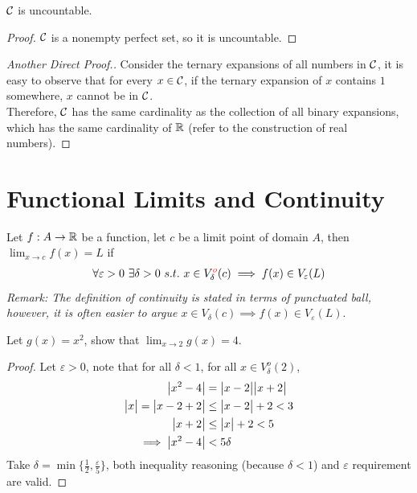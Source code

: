 \documentclass[11pt]{article}
\begin{document}
	\begin{proposition}
		$\mathcal{{C}}$ is uncountable.
	\end{proposition}
	
	\begin{proof}
		$\mathcal{{C}}$ is a nonempty perfect set, so it is uncountable.
	\end{proof}
	
	\begin{proof}[Another Direct Proof.]
		Consider the ternary expansions of all numbers in $\mathcal{{C}}$, it is easy to observe that for every $x \in \mathcal{{C}}$, if the ternary expansion of $x$ contains $1$ somewhere, $x$ cannot be in $\mathcal{{C}}$. \\
		Therefore, $\mathcal{{C}}$ has the same cardinality as the collection of all binary expansions, which has the same cardinality of $\mathbb{R}$ (refer to the construction of real numbers).
	\end{proof}
	
	\section{Functional Limits and Continuity}
	\begin{definition}
		Let $f: A \to \mathbb{R}$ be a function, let $c$ be a limit point of domain $A$, then $\lim_{x \to c} f(x) = L$ if 
		\begin{align}
			\forall \varepsilon > 0\ \exists \delta > 0\ s.t.\ x \in V_\delta^{\textcolor{red}{o}} (c) \implies f(x) \in V_\varepsilon(L)
		\end{align}
		\emph{Remark: The definition of continuity is stated in terms of punctuated ball, however, it is often easier to argue $x \in V_\delta(c) \implies f(x) \in V_\varepsilon(L)$}.
	\end{definition}
	
	\begin{example}
		Let $g(x) = x^2$, show that $\lim_{x \to 2} g(x) = 4$.
		\begin{proof}
			Let $\varepsilon > 0$, note that for all $\delta < 1$, for all $x \in V_\delta^o(2)$,
			\begin{align}
				\big \vert {x^2 - 4} \big \vert &= \big \vert {x-2} \big \vert \big \vert {x+2} \big \vert \\
				\big \vert {x} \big \vert = \big \vert {x-2+2} \big \vert &\leq \big \vert {x-2} \big \vert + 2 < 3 \\
				\big \vert {x+2} \big \vert &\leq \big \vert {x} \big \vert + 2 < 5 \\
				\implies \big \vert {x^2-4} \big \vert &< 5 \delta
			\end{align}
			Take $\delta = \min\{\frac{1}{2}, \frac{\varepsilon}{5}\}$, both inequality reasoning (because $\delta < 1$) and $\varepsilon$ requirement are valid.
		\end{proof}
	\end{example}
	
\end{document}
